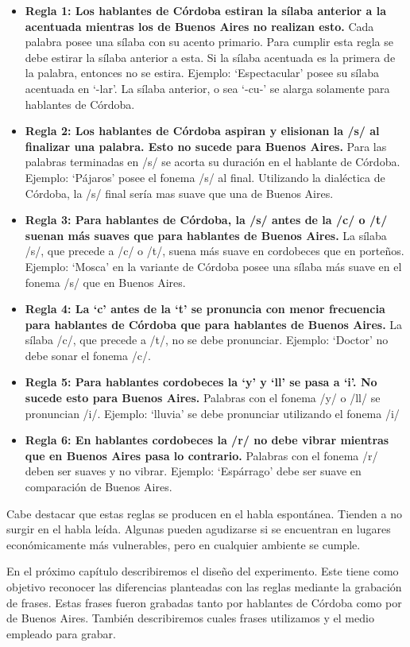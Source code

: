 \begin{itemize}

\item \textbf{Regla 1: Los hablantes de Córdoba estiran la sílaba anterior a la acentuada mientras los de Buenos Aires no realizan esto.} Cada palabra posee una sílaba con su acento primario. Para cumplir esta regla se debe estirar la sílaba anterior a esta. Si la sílaba acentuada es la primera de la palabra, entonces no se estira. Ejemplo: `Espectacular' posee su sílaba acentuada en `-lar'. La sílaba anterior, o sea `-cu-' se alarga solamente para hablantes de Córdoba. 

\item \textbf{Regla 2: Los hablantes de Córdoba aspiran y elisionan la /s/ al finalizar una palabra. Esto no sucede para Buenos Aires.} Para las palabras terminadas en /s/ se acorta su duración en el hablante de Córdoba. Ejemplo: `Pájaros' posee el fonema /s/ al final. Utilizando la dialéctica de Córdoba, la /s/ final sería mas suave que una de Buenos Aires. 

\item \textbf{Regla 3: Para hablantes de Córdoba, la /s/ antes de la /c/ o /t/ suenan más suaves que para hablantes de Buenos Aires.} La sílaba /s/, que precede a /c/ o /t/, suena más suave en cordobeces que en porteños. Ejemplo: `Mosca' en la variante de Córdoba posee una sílaba más suave en el fonema /s/ que en Buenos Aires. 

\item \textbf{Regla 4: La `c' antes de la `t' se pronuncia con menor frecuencia para hablantes de Córdoba que para hablantes de Buenos Aires.} La sílaba /c/, que precede a /t/, no se debe pronunciar. Ejemplo: `Doctor' no debe sonar el fonema /c/.

\item \textbf{Regla 5: Para hablantes cordobeces la `y’ y `ll’ se pasa a `i’. No sucede esto para Buenos Aires.} Palabras con el fonema /y/ o /ll/ se pronuncian /i/. Ejemplo: `lluvia' se debe pronunciar utilizando el fonema /i/ 

\item \textbf{Regla 6: En hablantes cordobeces la /r/ no debe vibrar mientras que en Buenos Aires pasa lo contrario.} Palabras con el fonema /r/ deben ser suaves y no vibrar. Ejemplo: `Espárrago' debe ser suave en comparación de Buenos Aires. 

\end{itemize}

Cabe destacar que estas reglas se producen en el habla espontánea. Tienden a no surgir en el habla leída. Algunas pueden agudizarse si se encuentran en lugares económicamente más vulnerables, pero en cualquier ambiente se cumple.

En el próximo capítulo describiremos el diseño del experimento. Este tiene como objetivo reconocer las diferencias planteadas con las reglas mediante la grabación de frases. Estas frases fueron grabadas tanto por hablantes de Córdoba como por de Buenos Aires. También describiremos cuales frases utilizamos y el medio empleado para grabar.
